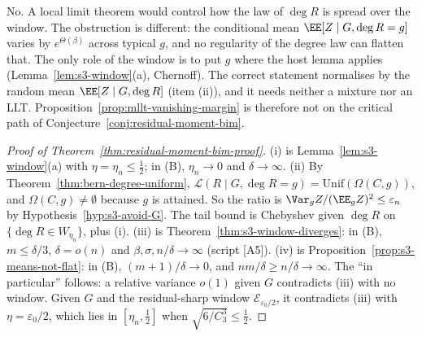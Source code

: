 \begin{remark}
\label{rem:s3-llt}
No. A local limit theorem would control how the law of \(\deg R\) is spread
over the window. The obstruction is different: the conditional mean
\(\EE[Z\mid G,\deg R=g]\) varies by \(e^{\Theta(\beta)}\) across typical \(g\), and
no regularity of the degree law can flatten that. The only role of the window
is to put \(g\) where the host lemma applies (Lemma~\ref{lem:s3-window}(a),
Chernoff). The correct statement normalises by the random mean
\(\EE[Z\mid G,\deg R]\) (item (ii)), and it needs neither a mixture nor an LLT.
Proposition~\ref{prop:mllt-vanishing-margin} is therefore not on the critical path
of Conjecture~\ref{conj:residual-moment-bim}.
\end{remark}

\begin{proof}[Proof of Theorem~\ref{thm:residual-moment-bim-proof}]
(i) is Lemma~\ref{lem:s3-window}(a) with \(\eta=\eta_n\le\frac12\); in (B),
\(\eta_n\to0\) and \(\delta\to\infty\). (ii) By Theorem~\ref{thm:bern-degree-uniform},
\(\mathcal L(R\mid G,\deg R=g)=\mathrm{Unif}(\Omega(C,g))\), and
\(\Omega(C,g)\ne\emptyset\) because \(g\) is attained. So the ratio is
\(\Var_gZ/(\EE_gZ)^2\le\varepsilon_n\) by Hypothesis~\ref{hyp:s3-avoid-G}. The tail
bound is Chebyshev given \(\deg R\) on \(\{\deg R\in W_{\eta_n}\}\), plus (i). (iii) is
Theorem~\ref{thm:s3-window-diverges}: in (B), \(m\le\delta/3\), \(\delta=o(n)\) and
\(\beta,\sigma,n/\delta\to\infty\) (script [A5]). (iv) is
Proposition~\ref{prop:s3-means-not-flat}: in (B), \((m+1)/\delta\to0\), and
\(nm/\delta\ge n/\delta\to\infty\). The ``in particular'' follows: a relative
variance \(o(1)\) given \(G\) contradicts (iii) with no window. Given \(G\) and
the residual-sharp window \(\mathcal E_{\varepsilon_0/2}\), it contradicts (iii) with
\(\eta=\varepsilon_0/2\), which lies in \([\eta_n,\frac12]\) when \(\sqrt{6/C_3^3}\le\frac12\).
\end{proof}

